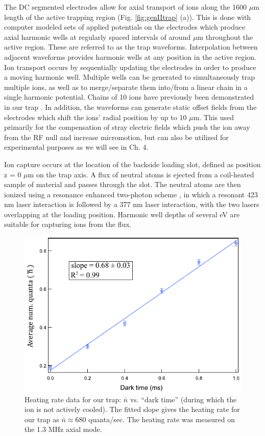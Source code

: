 The DC segmented electrodes allow for axial transport of ions along the 1600 $\mu$m length of the active trapping region (Fig. \ref{fig:genIItrap} (a)). This is done with computer modeled sets of applied potentials on the electrodes which produce axial harmonic wells at regularly spaced intervals of around $\mu$m throughout the active region. These are referred to as the trap waveforms. Interpolation between adjacent waveforms provides harmonic wells at any position in the active region. Ion transport occurs by sequentially updating the electrodes in order to produce a moving harmonic well. Multiple wells can be generated to simultaneously trap multiple ions, as well as to merge/separate them into/from a linear chain in a single harmonic potential. Chains of 10 ions have previously been demonstrated in our trap \cite{IonTrap}. In addition, the waveforms can generate static offset fields from the electrodes which shift the ions' radial position by up to 10 $\mu$m. This used primarily for the compensation of stray electric fields which push the ion away from the RF null and increase micromotion, but can also be utilized for experimental purposes as we will see in Ch. 4.

Ion capture occurs at the location of the backside loading slot, defined as position z = 0 $\mu$m on the trap axis. A flux of neutral atoms is ejected from a coil-heated sample of material and passes through the slot. The neutral atoms are then ionized using a resonance enhanced two-photon scheme \cite{Gulde2001}, in which a resonant 423 nm laser interaction is followed by a 377 nm laser interaction, with the two lasers overlapping at the loading position. Harmonic well depths of several eV are suitable for capturing ions from the flux. 

\begin{figure}[t]
    \begin{center}
        \includegraphics{figures/3/Fig_HeatingRate}
        \caption{\label{fig:heatingrate} Heating rate data for our trap: $\bar{n}$ vs. ``dark time'' (during which the ion is not actively cooled). The fitted slope gives the heating rate for our trap as $\dot{\bar{n}} \approx 680$ quanta/sec. The heating rate was measured on the 1.3 MHz axial mode. }
    \end{center}
\end{figure}


